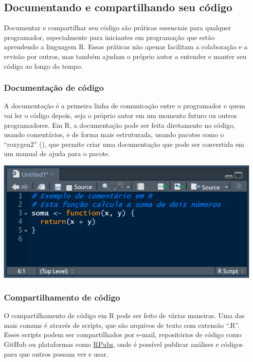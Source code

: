 \documentclass[
]{book}
\begin{document}
\subsection{Documentando e compartilhando seu código}\label{documentando-e-compartilhando-seu-cuxf3digo}

Documentar e compartilhar seu código são práticas essenciais para qualquer programador, especialmente para iniciantes em programação que estão aprendendo a linguagem R. Essas práticas não apenas facilitam a colaboração e a revisão por outros, mas também ajudam o próprio autor a entender e manter seu código ao longo do tempo.

\subsubsection{Documentação de código}\label{documentauxe7uxe3o-de-cuxf3digo}

A documentação é a primeira linha de comunicação entre o programador e quem vai ler o código depois, seja o próprio autor em um momento futuro ou outros programadores. Em R, a documentação pode ser feita diretamente no código, usando comentários, e de forma mais estruturada, usando pacotes como o ``roxygen2'' (), que permite criar uma documentação que pode ser convertida em um manual de ajuda para o pacote.

\includegraphics{images/clipboard-3987177554.png}

\subsubsection{Compartilhamento de código}\label{compartilhamento-de-cuxf3digo}

O compartilhamento de código em R pode ser feito de várias maneiras. Uma das mais comuns é através de scripts, que são arquivos de texto com extensão ``.R''. Esses scripts podem ser compartilhados por e-mail, repositórios de código como GitHub ou plataformas como \href{https://rpubs.com}{RPubs}, onde é possível publicar análises e códigos para que outros possam ver e usar.
\end{document}

